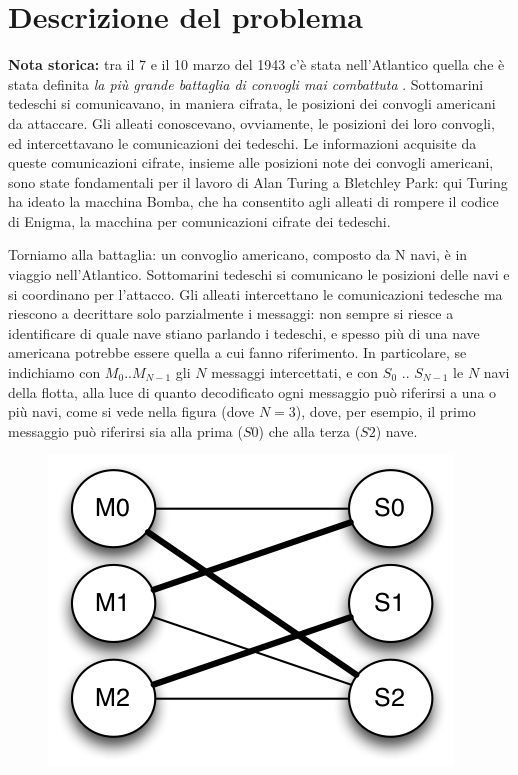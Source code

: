 \documentclass[a4paper,11pt]{article}
\begin{document}
\vspace{0.5cm}



\section*{Descrizione del problema}
  
\textbf{Nota storica:} tra il 7 e il 10 marzo del 1943 c'è stata
nell'Atlantico  quella che è stata definita \emph{la più grande
battaglia di convogli mai combattuta} . Sottomarini tedeschi si
comunicavano, in maniera cifrata, le posizioni dei convogli americani da
attaccare. Gli alleati conoscevano, ovviamente, le posizioni dei loro
convogli, ed intercettavano le comunicazioni dei tedeschi. Le
informazioni acquisite da queste comunicazioni cifrate, insieme alle
posizioni note dei convogli americani, sono state fondamentali per il
lavoro di Alan Turing a Bletchley Park: qui Turing ha ideato la macchina
Bomba, che ha consentito agli alleati di rompere il codice di Enigma, la
macchina per comunicazioni cifrate dei tedeschi. 
    
Torniamo alla battaglia: un convoglio americano, composto da N navi, è
in viaggio nell'Atlantico. Sottomarini tedeschi si comunicano le
posizioni delle navi e si coordinano per l'attacco. Gli alleati
intercettano le comunicazioni tedesche ma riescono a decrittare solo
parzialmente i messaggi: non sempre si riesce a identificare di quale
nave stiano parlando i tedeschi, e spesso più di una nave americana
potrebbe essere quella a cui fanno riferimento. In particolare, se
indichiamo con $M_{0}$..$M_{N-1}$ gli $N$ messaggi intercettati, e con
$S_{0}$ .. $S_{N-1}$ le $N$ navi della flotta, alla luce di quanto
decodificato ogni messaggio può riferirsi a una o più navi, come si vede
nella figura (dove $N=3$), dove, per esempio, il primo messaggio può
riferirsi sia alla prima ($S0$) che alla terza ($S2$) nave. 
    
\begin{figure}[h!]
  \centering
  \caption{}
  \includegraphics{figura.png}
\end{figure}
\end{document}
